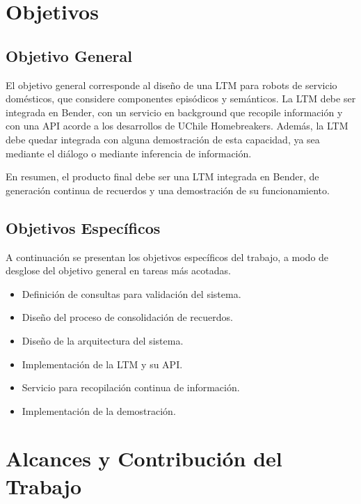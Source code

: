 

\section{Objetivos}

\subsection{Objetivo General}

El objetivo general corresponde al diseño de una LTM para robots de servicio domésticos, que considere componentes episódicos y semánticos. La LTM debe ser integrada en Bender, con un servicio en background que recopile información y con una API acorde a los desarrollos de UChile Homebreakers. Además, la LTM debe quedar integrada con alguna demostración de esta capacidad, ya sea mediante el diálogo o mediante inferencia de información.

En resumen, el producto final debe ser una LTM integrada en Bender, de generación continua de recuerdos y una demostración de su funcionamiento.


\subsection{Objetivos Específicos}

A continuación se presentan los objetivos específicos del trabajo, a modo de desglose del objetivo general en tareas más acotadas.

\begin{itemize}
\item Definición de consultas para validación del sistema.
\item Diseño del proceso de consolidación de recuerdos.
\item Diseño de la arquitectura del sistema.
\item Implementación de la LTM y su API.
\item Servicio para recopilación continua de información.
\item Implementación de la demostración.
\end{itemize}

\section{Alcances y Contribución del Trabajo}

